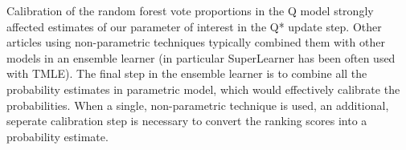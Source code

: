 \documentclass[]{article}\usepackage[]{graphicx}\usepackage[]{color}
\begin{document}


 


Calibration of the random forest vote proportions in the Q model strongly affected estimates of our parameter of interest in the Q* update step. Other articles using non-parametric techniques typically combined them with other models in an ensemble learner (in particular SuperLearner has been often used with TMLE). The final step in the ensemble learner is to combine all the probability estimates in parametric model, which would effectively calibrate the probabilities. When a single, non-parametric technique is used, an additional, seperate calibration step is necessary to convert the ranking scores into a probability estimate.


\printbibliography
\end{document}
